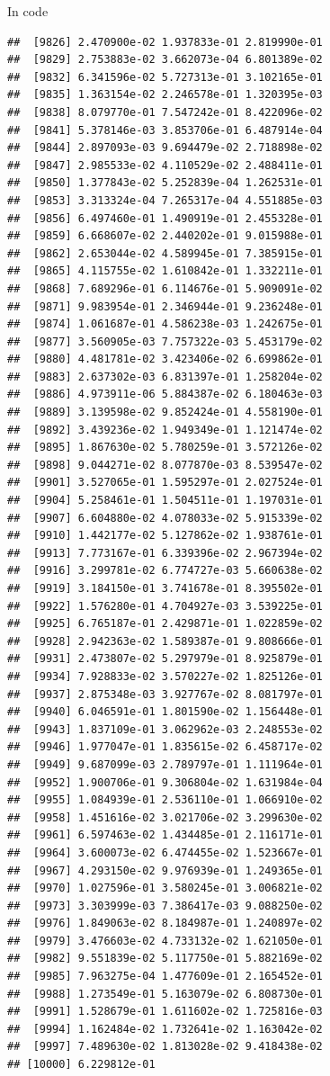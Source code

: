 \documentclass[ignorenonframetext,]{beamer}
\begin{document}
\begin{frame}[fragile]{In code}
\begin{verbatim}
##  [9826] 2.470900e-02 1.937833e-01 2.819990e-01
##  [9829] 2.753883e-02 3.662073e-04 6.801389e-02
##  [9832] 6.341596e-02 5.727313e-01 3.102165e-01
##  [9835] 1.363154e-02 2.246578e-01 1.320395e-03
##  [9838] 8.079770e-01 7.547242e-01 8.422096e-02
##  [9841] 5.378146e-03 3.853706e-01 6.487914e-04
##  [9844] 2.897093e-03 9.694479e-02 2.718898e-02
##  [9847] 2.985533e-02 4.110529e-02 2.488411e-01
##  [9850] 1.377843e-02 5.252839e-04 1.262531e-01
##  [9853] 3.313324e-04 7.265317e-04 4.551885e-03
##  [9856] 6.497460e-01 1.490919e-01 2.455328e-01
##  [9859] 6.668607e-02 2.440202e-01 9.015988e-01
##  [9862] 2.653044e-02 4.589945e-01 7.385915e-01
##  [9865] 4.115755e-02 1.610842e-01 1.332211e-01
##  [9868] 7.689296e-01 6.114676e-01 5.909091e-02
##  [9871] 9.983954e-01 2.346944e-01 9.236248e-01
##  [9874] 1.061687e-01 4.586238e-03 1.242675e-01
##  [9877] 3.560905e-03 7.757322e-03 5.453179e-02
##  [9880] 4.481781e-02 3.423406e-02 6.699862e-01
##  [9883] 2.637302e-03 6.831397e-01 1.258204e-02
##  [9886] 4.973911e-06 5.884387e-02 6.180463e-03
##  [9889] 3.139598e-02 9.852424e-01 4.558190e-01
##  [9892] 3.439236e-02 1.949349e-01 1.121474e-02
##  [9895] 1.867630e-02 5.780259e-01 3.572126e-02
##  [9898] 9.044271e-02 8.077870e-03 8.539547e-02
##  [9901] 3.527065e-01 1.595297e-01 2.027524e-01
##  [9904] 5.258461e-01 1.504511e-01 1.197031e-01
##  [9907] 6.604880e-02 4.078033e-02 5.915339e-02
##  [9910] 1.442177e-02 5.127862e-02 1.938761e-01
##  [9913] 7.773167e-01 6.339396e-02 2.967394e-02
##  [9916] 3.299781e-02 6.774727e-03 5.660638e-02
##  [9919] 3.184150e-01 3.741678e-01 8.395502e-01
##  [9922] 1.576280e-01 4.704927e-03 3.539225e-01
##  [9925] 6.765187e-01 2.429871e-01 1.022859e-02
##  [9928] 2.942363e-02 1.589387e-01 9.808666e-01
##  [9931] 2.473807e-02 5.297979e-01 8.925879e-01
##  [9934] 7.928833e-02 3.570227e-02 1.825126e-01
##  [9937] 2.875348e-03 3.927767e-02 8.081797e-01
##  [9940] 6.046591e-01 1.801590e-02 1.156448e-01
##  [9943] 1.837109e-01 3.062962e-03 2.248553e-02
##  [9946] 1.977047e-01 1.835615e-02 6.458717e-02
##  [9949] 9.687099e-03 2.789797e-01 1.111964e-01
##  [9952] 1.900706e-01 9.306804e-02 1.631984e-04
##  [9955] 1.084939e-01 2.536110e-01 1.066910e-02
##  [9958] 1.451616e-02 3.021706e-02 3.299630e-02
##  [9961] 6.597463e-02 1.434485e-01 2.116171e-01
##  [9964] 3.600073e-02 6.474455e-02 1.523667e-01
##  [9967] 4.293150e-02 9.976939e-01 1.249365e-01
##  [9970] 1.027596e-01 3.580245e-01 3.006821e-02
##  [9973] 3.303999e-03 7.386417e-03 9.088250e-02
##  [9976] 1.849063e-02 8.184987e-01 1.240897e-02
##  [9979] 3.476603e-02 4.733132e-02 1.621050e-01
##  [9982] 9.551839e-02 5.117750e-01 5.882169e-02
##  [9985] 7.963275e-04 1.477609e-01 2.165452e-01
##  [9988] 1.273549e-01 5.163079e-02 6.808730e-01
##  [9991] 1.528679e-01 1.611602e-02 1.725816e-03
##  [9994] 1.162484e-02 1.732641e-02 1.163042e-02
##  [9997] 7.489630e-02 1.813028e-02 9.418438e-02
## [10000] 6.229812e-01
\end{verbatim}


\end{frame}
\end{document}
